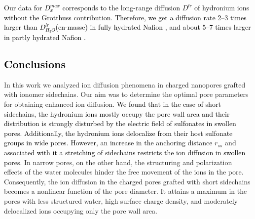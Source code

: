 \documentclass[3p,english,preprint]{elsarticle}
\newcommand{\need}[1]{\textcolor{black}{#1}}
\newcommand{\mod}[1]{\textcolor{black}{#1}}
\newcommand{\mage}[1]{\textcolor{black}{#1}}
\begin{document}
{\need{
Our data for $D_x^{max}$ corresponds to the long-range diffusion $D^{lr}$ of hydronium ions without the 
Grotthuss contribution. Therefore,  we get 
a diffusion rate 2--3 times larger  than  $D_{H_3O}^{lr}$(en-masse) 
in fully hydrated 
Nafion \cite{li-2001-partial-charges,sun-2015-md-simulation-diffusion}, 
and about 5--7 times larger  in partly hydrated Nafion \cite{perrin-2007,cui-2008}. 
}}













{\mod{ 
\section{Conclusions}
}}
\label{conclusons}

In this work we analyzed  ion diffusion phenomena in charged nanopores grafted 
with ionomer sidechains. Our aim was to  determine the  optimal pore parameters
 for obtaining   enhanced ion diffusion.  
{\need{ 
We found that in the case of short sidechains, the hydronium ions mostly occupy the pore wall area 
and  their distribution is strongly disturbed by the electric field 
of sulfonates in swollen pores. Additionally, the hydronium ions delocalize from their host sulfonate 
groups in wide pores. However, an increase in the anchoring distance $r_{ss}$ and associated with it  
a stretching of sidechains  restricts the  ion diffusion in swollen pores. 
}}
In narrow pores, on the other hand,  the structuring and polarization effects  of the  water molecules
 hinder  the free movement of the ions in the pore. 
Consequently, the ion diffusion in the charged pores grafted with short sidechains
  becomes  a nonlinear function of the pore diameter. 
It attains a  maximum in the pores with less structured water,  
 high surface charge density, and  moderately delocalized ions occupying only the 
pore wall area. 
\end{document}
